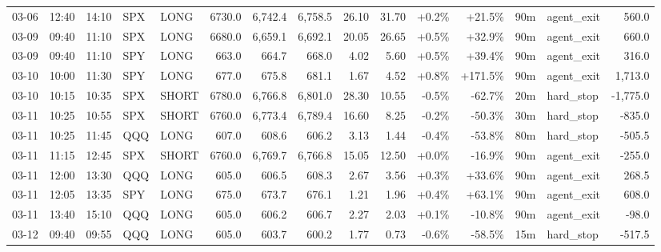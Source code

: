 \documentclass[11pt,a4paper,twoside]{article}
\begin{document}
\begin{landscape}
\begin{center}
\begin{longtable}{>{\color{txtmain}}l l l l l r r r r r r r r >{\color{txtmain}}l r}
03-06 & 12:40 & 14:10 & SPX & LONG & 6730.0 & 6,742.4 & 6,758.5 & 26.10 & 31.70 & \textcolor{wingreen}{+0.2\%} & \textcolor{wingreen}{+21.5\%} & 90m & agent\_exit & \textcolor{wingreen}{560.0} \\
03-09 & 09:40 & 11:10 & SPX & LONG & 6680.0 & 6,659.1 & 6,692.1 & 20.05 & 26.65 & \textcolor{wingreen}{+0.5\%} & \textcolor{wingreen}{+32.9\%} & 90m & agent\_exit & \textcolor{wingreen}{660.0} \\
03-09 & 09:40 & 11:10 & SPY & LONG & 663.0 & 664.7 & 668.0 & 4.02 & 5.60 & \textcolor{wingreen}{+0.5\%} & \textcolor{wingreen}{+39.4\%} & 90m & agent\_exit & \textcolor{wingreen}{316.0} \\
03-10 & 10:00 & 11:30 & SPY & LONG & 677.0 & 675.8 & 681.1 & 1.67 & 4.52 & \textcolor{wingreen}{+0.8\%} & \textcolor{wingreen}{+171.5\%} & 90m & agent\_exit & \textcolor{wingreen}{1,713.0} \\
03-10 & 10:15 & 10:35 & SPX & SHORT & 6780.0 & 6,766.8 & 6,801.0 & 28.30 & 10.55 & \textcolor{lossred}{-0.5\%} & \textcolor{lossred}{-62.7\%} & 20m & hard\_stop & \textcolor{lossred}{-1,775.0} \\
03-11 & 10:25 & 10:55 & SPX & SHORT & 6760.0 & 6,773.4 & 6,789.4 & 16.60 & 8.25 & \textcolor{lossred}{-0.2\%} & \textcolor{lossred}{-50.3\%} & 30m & hard\_stop & \textcolor{lossred}{-835.0} \\
03-11 & 10:25 & 11:45 & QQQ & LONG & 607.0 & 608.6 & 606.2 & 3.13 & 1.44 & \textcolor{lossred}{-0.4\%} & \textcolor{lossred}{-53.8\%} & 80m & hard\_stop & \textcolor{lossred}{-505.5} \\
03-11 & 11:15 & 12:45 & SPX & SHORT & 6760.0 & 6,769.7 & 6,766.8 & 15.05 & 12.50 & \textcolor{wingreen}{+0.0\%} & \textcolor{lossred}{-16.9\%} & 90m & agent\_exit & \textcolor{lossred}{-255.0} \\
03-11 & 12:00 & 13:30 & QQQ & LONG & 605.0 & 606.5 & 608.3 & 2.67 & 3.56 & \textcolor{wingreen}{+0.3\%} & \textcolor{wingreen}{+33.6\%} & 90m & agent\_exit & \textcolor{wingreen}{268.5} \\
03-11 & 12:05 & 13:35 & SPY & LONG & 675.0 & 673.7 & 676.1 & 1.21 & 1.96 & \textcolor{wingreen}{+0.4\%} & \textcolor{wingreen}{+63.1\%} & 90m & agent\_exit & \textcolor{wingreen}{608.0} \\
03-11 & 13:40 & 15:10 & QQQ & LONG & 605.0 & 606.2 & 606.7 & 2.27 & 2.03 & \textcolor{wingreen}{+0.1\%} & \textcolor{lossred}{-10.8\%} & 90m & agent\_exit & \textcolor{lossred}{-98.0} \\
03-12 & 09:40 & 09:55 & QQQ & LONG & 605.0 & 603.7 & 600.2 & 1.77 & 0.73 & \textcolor{lossred}{-0.6\%} & \textcolor{lossred}{-58.5\%} & 15m & hard\_stop & \textcolor{lossred}{-517.5} \\

\end{longtable}
\end{center}
\end{landscape}
\end{document}
